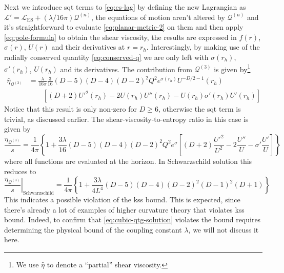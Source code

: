 \documentclass[a4paper,11pt]{article}
\begin{document}
Next we introduce \ac{sqt} terms to \eqref{eq:es-lag} by defining the new Lagrangian as $\mathcal L' = \mathcal L_{\mathrm{ES}} + (\lambda / 16\pi)\mathcal Q^{(n)}$, the equations of motion aren't altered by $\mathcal Q^{(n)}$ and it's straightforward to evaluate \eqref{eq:planar-metric-2} on them and then apply \eqref{eq:pole-formula} to obtain the shear viscosity, the results are expressed in $f(r)$, $\sigma(r)$, $U(r)$ and their derivatives at $r = r_h$. Interestingly, by making use of the radially conserved quantity \eqref{eq:conserved-q} we are only left with $\sigma(r_h)$, $\sigma'(r_h)$, $U(r_h)$ and its derivatives. The contribution from $\mathcal Q^{(3)}$ is given by\footnote{We use $\hat\eta$ to denote a ``partial'' shear viscosity.}
\begin{align}
    \hat\eta_{\mathcal Q^{(3)}} & = \frac{\lambda}{16\pi}\frac{3}{16}(D-5) (D-4) (D-2)^2 Q^2 e^{\sigma (r_h)} U^{-D/2-1}(r_h)\nonumber\\
    & \qquad \left[(D+2) U'^2(r_h)-2 U(r_h) U''(r_h)-U(r_h) \sigma'(r_h) U'(r_h)\right]
\end{align}
Notice that this result is only non-zero for $D \geqslant 6$, otherwise the \ac{sqt} term is trivial, as discussed earlier. The shear-viscosity-to-entropy ratio in this case is given by
\begin{equation}\label{eq:cubic-qtg-eta-to-s}
    \frac{\eta_{\mathcal Q^{(3)}}}{s} = \frac{1}{4\pi}\left\{1 + \frac{3\lambda}{16}(D-5) (D-4) (D-2)^2 Q^2 e^{\sigma}\left[
        (D + 2)\frac{U'^2}{U^2} - 2\frac{U''}{U} - \sigma'\frac{U'}{U}
    \right]\right\}
\end{equation}
where all functions are evaluated at the horizon. In Schwarzschild solution this reduces to
\begin{equation}
    \left.\frac{\eta_{\mathcal Q^{(3)}}}{s}\right|_{\mathrm{Schwarzschild}} = \frac{1}{4\pi}\left\{1 + \frac{3\lambda}{4L^4} (D - 5)(D - 4)(D - 2)^2 (D - 1)^2 (D + 1)\right\}
\end{equation}
This indicates a possible violation of the \ac{kss} bound. This is expected, since there's already a lot of examples of higher curvature theory that violates \ac{kss} bound. Indeed, to confirm that \eqref{eq:cubic-qtg-solution} violates the bound requires determining the physical bound of the coupling constant $\lambda$, we will not discuss it here.
\end{document}
